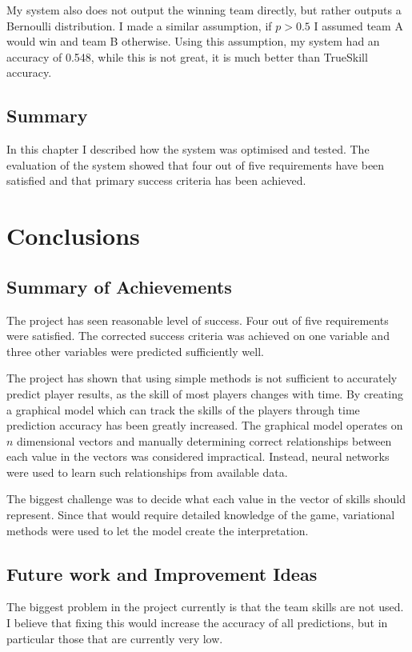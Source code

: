 \documentclass[12pt,a4paper]{book}
\begin{document}
My system also does not output the winning team directly, but rather outputs a Bernoulli distribution.
I made a similar assumption, if $p > 0.5$ I assumed team A would win and team B otherwise.
Using this assumption, my system had an accuracy of 0.548, while this is not great, it is much better than TrueSkill accuracy.

\section{Summary}
In this chapter I described how the system was optimised and tested.
The evaluation of the system showed that four out of five requirements have been satisfied and that primary success criteria has been achieved.

\chapter{Conclusions}
\section{Summary of Achievements}
The project has seen reasonable level of success.
Four out of five requirements were satisfied.
The corrected success criteria was achieved on one variable and three other variables were predicted sufficiently well.

The project has shown that using simple methods is not sufficient to accurately predict player results, as the skill of most players changes with time.
By creating a graphical model which can track the skills of the players through time prediction accuracy has been greatly increased.
The graphical model operates on $n$ dimensional vectors and manually determining correct relationships between each value in the vectors was considered impractical.
Instead, neural networks were used to learn such relationships from available data.

The biggest challenge was to decide what each value in the vector of skills should represent.
Since that would require detailed knowledge of the game, variational methods were used to let the model create the interpretation.

\section{Future work and Improvement Ideas}
The biggest problem in the project currently is that the team skills are not used.
I believe that fixing this would increase the accuracy of all predictions, but in particular those that are currently very low.
\end{document}
